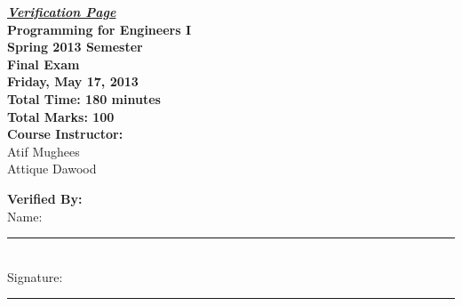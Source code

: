\documentclass[12pt,a4paper]{article}
\begin{document}
\begin{center}
{\Huge \underline{\textbf{\textit{Verification Page}}}}\\[1.75cm]
{\LARGE \textbf{Programming for Engineers I}}\\[0.15cm]
{\normalsize \textbf{Spring 2013 Semester}}\\[0.15cm]
{\Large \textbf{Final Exam}}\\[0.15cm]
{\normalsize \textbf{Friday, May 17, 2013}}\\[0.45cm]
{\Large \textbf{Total Time: 180 minutes}}\\[0.15cm]
{\Large \textbf{Total Marks: 100}}\\[0.35cm]
\textbf{Course Instructor:}\\
Atif Mughees\\
Attique Dawood\\[0.5cm]
\end{center}
\textbf{Verified By:}\\[0.55cm]
Name: \rule{5.65cm}{0.2mm}\\[0.55cm]
Signature: \rule{5cm}{0.2mm}\\[0.55cm]
\end{document}
